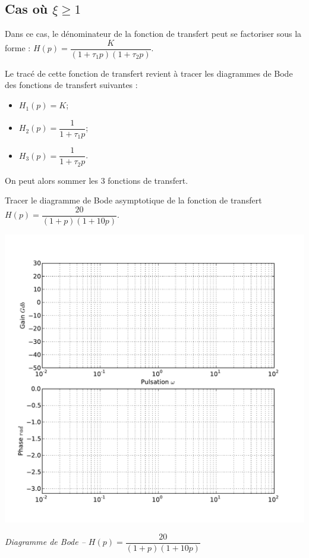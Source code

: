 \documentclass[10pt,oneside]{article}
\begin{document}
\subsection{Cas où $\xi\geq1$}
Dans ce cas, le dénominateur de la fonction de transfert peut se factoriser sous la forme :
$H(p)=\dfrac{K}{\left(1+\tau_1 p \right)\left(1+\tau_2 p \right)}$.

Le tracé de cette fonction de transfert revient à tracer les diagrammes de Bode des fonctions de transfert suivantes :
\begin{itemize}
\item $H_1(p)=K$;
\item $H_2(p)=\dfrac{1}{1+\tau_1 p }$;
\item $H_3(p)=\dfrac{1}{1+\tau_2 p }$.
\end{itemize}

On peut alors sommer les 3 fonctions de transfert. 

Tracer le diagramme de Bode asymptotique de la fonction de transfert 
$H(p)=\dfrac{20}{\left(1+ p \right)\left(1+10 p \right)}$.

\begin{center}
\includegraphics[width=.8\textwidth]{png/bode_vierge.pdf}

\textit{Diagramme de Bode -- $H(p)=\dfrac{20}{\left(1+ p \right)\left(1+10 p \right)}$}
\end{center}

\end{document}
